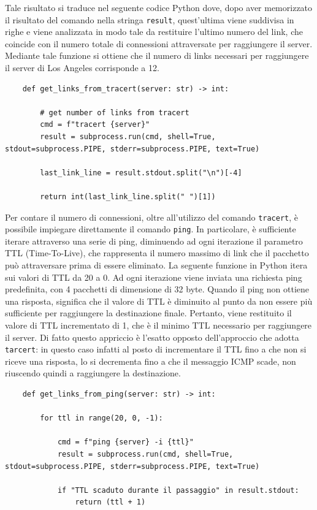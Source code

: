 \noindent Tale risultato si traduce nel seguente codice Python dove, dopo aver memorizzato il risultato del comando nella stringa \texttt{result}, quest'ultima viene suddivisa in righe e viene analizzata in modo tale da restituire l'ultimo numero del link, che coincide con il numero totale di connessioni attraversate per raggiungere il server. Mediante tale funzione si ottiene che il numero di links necessari per raggiungere il server di Los Angeles corrisponde a 12.

\begin{lstlisting}
    def get_links_from_tracert(server: str) -> int:

        # get number of links from tracert
        cmd = f"tracert {server}"
        result = subprocess.run(cmd, shell=True, stdout=subprocess.PIPE, stderr=subprocess.PIPE, text=True)

        last_link_line = result.stdout.split("\n")[-4]

        return int(last_link_line.split(" ")[1])
\end{lstlisting}

\noindent Per contare il numero di connessioni, oltre all'utilizzo del comando \texttt{tracert}, è possibile impiegare direttamente il comando \texttt{ping}. In particolare, è sufficiente iterare attraverso una serie di ping, diminuendo ad ogni iterazione il parametro TTL (Time-To-Live), che rappresenta il numero massimo di link che il pacchetto può attraversare prima di essere eliminato. La seguente funzione in Python itera sui valori di TTL da 20 a 0. Ad ogni iterazione viene inviata una richiesta ping predefinita, con 4 pacchetti di dimensione di 32 byte. Quando il ping non ottiene una risposta, significa che il valore di TTL è diminuito al punto da non essere più sufficiente per raggiungere la destinazione finale. Pertanto, viene restituito il valore di TTL incrementato di 1, che è il minimo TTL necessario per raggiungere il server. Di fatto questo appriccio è l'esatto opposto dell'approccio che adotta \texttt{tarcert}: in questo caso infatti al posto di incrementare il TTL fino a che non si riceve una risposta, lo si decrementa fino a che il messaggio ICMP scade, non riuscendo quindi a raggiungere la destinazione.

\begin{lstlisting}
    def get_links_from_ping(server: str) -> int:

        for ttl in range(20, 0, -1):

            cmd = f"ping {server} -i {ttl}"
            result = subprocess.run(cmd, shell=True, stdout=subprocess.PIPE, stderr=subprocess.PIPE, text=True)

            if "TTL scaduto durante il passaggio" in result.stdout:
                return (ttl + 1)
\end{lstlisting}

